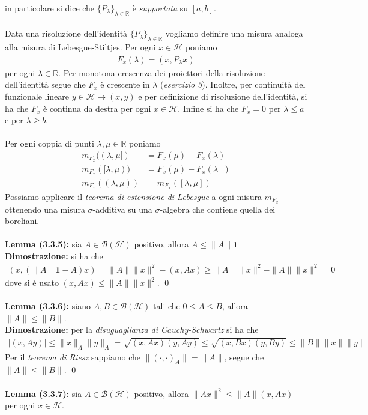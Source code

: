 \documentclass{article}
\numberwithin{equation}{subsection}
\begin{document}
in particolare si dice che $\{P_\lambda\}_{\lambda \in \mathbb{R}}$ è \textit{supportata} su $[a, b]$. \\ \\
Data una risoluzione dell'identità $\{P_\lambda\}_{\lambda \in \mathbb{R}}$ vogliamo definire una misura analoga alla misura di Lebesgue-Stiltjes. Per ogni $x \in \mathcal{H}$ poniamo
\begin{align*}
    F_x(\lambda) = (x, P_\lambda x) 
\end{align*}
per ogni $\lambda \in \mathbb{R}$. Per monotona crescenza dei proiettori della risoluzione dell'identità segue che $F_x$ è crescente in $\lambda$ (\textit{esercizio 3}). Inoltre, per continuità del funzionale lineare $y \in \mathcal{H} \mapsto (x, y)$ e per definizione di risoluzione dell'identità, si ha che $F_x$ è continua da destra per ogni $x \in \mathcal{H}$. Infine si ha che $F_x = 0$ per $\lambda \leq a$ e per $\lambda \geq b$. \\ \\
Per ogni coppia di punti $\lambda, \mu \in \mathbb{R}$ poniamo
\begin{align*}
    m_{F_x}((\lambda, \mu]) &= F_x(\mu) - F_x(\lambda)  \\
    m_{F_x}([\lambda, \mu)) &= F_x(\mu) - F_x(\lambda^-)  \\
    m_{F_x}((\lambda, \mu)) &= m_{F_x}([\lambda, \mu]) 
\end{align*}
Possiamo applicare il \textit{teorema di estensione di Lebesgue} a ogni misura $m_{F_x}$ ottenendo una misura $\sigma$-additiva su una $\sigma$-algebra che contiene quella dei boreliani. \\ \\
\textbf{Lemma (3.3.5):} sia $A \in \mathcal{B}(\mathcal{H})$ positivo, allora $A \leq \|A\|\mathbf{1}$ \\

\textbf{Dimostrazione:} si ha che 
\begin{align*}
    (x, (\|A\|\mathbf{1} - A)x) = \|A\|\|x\|^2 - (x, Ax) \geq \|A\|\|x\|^2 - \|A\|\|x\|^2 = 0 
\end{align*}
dove si è usato $(x, Ax) \leq \|A\|\|x\|^2$. \qed \\ \\
\textbf{Lemma (3.3.6):} siano $A, B \in \mathcal{B}(\mathcal{H})$ tali che $0 \leq A \leq B$, allora $\|A\| \leq \|B\|$. \\

\textbf{Dimostrazione:} per la \textit{disuguaglianza di Cauchy-Schwartz} si ha che 
\begin{align*}
    |(x, Ay)| \leq \|x\|_A\|y\|_A = \sqrt{(x, Ax)(y, Ay)} \leq \sqrt{(x, Bx)(y, By)} \leq \|B\|\|x\|\|y\| 
\end{align*}
Per il \textit{teorema di Riesz} sappiamo che $\|(\cdot, \cdot)_A\| = \|A\|$, segue che $\|A\| \leq \|B\|$. \qed \\ \\
\textbf{Lemma (3.3.7):} sia $A \in \mathcal{B}(\mathcal{H})$ positivo, allora $\|Ax\|^2 \leq \|A\|(x, Ax)$ per ogni $x \in \mathcal{H}$. \\
\end{document}
